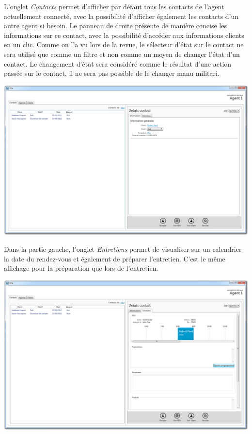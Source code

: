 L'onglet \textit{Contacts } permet d'afficher par défaut tous les contacts de l'agent actuellement connecté, avec la possibilité d'afficher également les contacts d'un autre agent si besoin. Le panneau de droite présente de manière concise les informations sur ce contact, avec la possibilité d'accéder aux informations clients en un clic.
Comme on l'a vu lors de la revue, le sélecteur d'état sur le contact ne sera utilisé que comme un filtre et non comme un moyen de changer l'état d'un contact. Le changement d'état sera considéré comme le résultat d'une action passée sur le contact, il ne sera pas possible de le changer manu militari.
\medskip
\begin {center}
\includegraphics[width=\textwidth]{../../ihm/pngIHM/ListeContacts.png}
\end {center}
\medskip


Dans la partie gauche, l'onglet \textit{Entretiens} permet de visualiser sur un calendrier la date du rendez-vous et également de préparer l'entretien. C'est le même affichage pour la préparation que lors de l'entretien.
\medskip
\begin {center}
\includegraphics[width=\textwidth]{../../ihm/pngIHM/ContactEntretiens1.png}
\end {center}
\medskip

